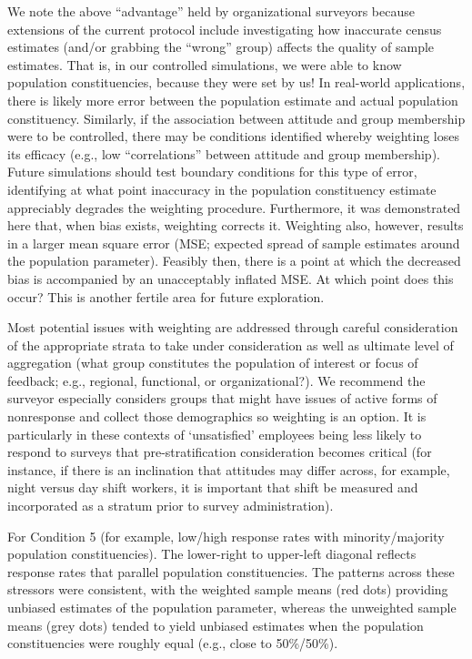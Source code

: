 \documentclass[
  man,mask]{apa7}
\begin{document}
We note the above ``advantage'' held by organizational surveyors because extensions of the current protocol include investigating how inaccurate census estimates (and/or grabbing the ``wrong'' group) affects the quality of sample estimates. That is, in our controlled simulations, we were able to know population constituencies, because they were set by us! In real-world applications, there is likely more error between the population estimate and actual population constituency. Similarly, if the association between attitude and group membership were to be controlled, there may be conditions identified whereby weighting loses its efficacy (e.g., low ``correlations'' between attitude and group membership). Future simulations should test boundary conditions for this type of error, identifying at what point inaccuracy in the population constituency estimate appreciably degrades the weighting procedure. Furthermore, it was demonstrated here that, when bias exists, weighting corrects it. Weighting also, however, results in a larger mean square error (MSE; expected spread of sample estimates around the population parameter). Feasibly then, there is a point at which the decreased bias is accompanied by an unacceptably inflated MSE. At which point does this occur? This is another fertile area for future exploration.

Most potential issues with weighting are addressed through careful consideration of the appropriate strata to take under consideration as well as ultimate level of aggregation (what group constitutes the population of interest or focus of feedback; e.g., regional, functional, or organizational?). We recommend the surveyor especially considers groups that might have issues of active forms of nonresponse and collect those demographics so weighting is an option. It is particularly in these contexts of `unsatisfied' employees being less likely to respond to surveys that pre-stratification consideration becomes critical (for instance, if there is an inclination that attitudes may differ across, for example, night versus day shift workers, it is important that shift be measured and incorporated as a stratum prior to survey administration).

For Condition 5 (for example, low/high response rates with minority/majority population constituencies). The lower-right to upper-left diagonal reflects response rates that parallel population constituencies. The patterns across these stressors were consistent, with the weighted sample means (red dots) providing unbiased estimates of the population parameter, whereas the unweighted sample means (grey dots) tended to yield unbiased estimates when the population constituencies were roughly equal (e.g., close to 50\%/50\%).
\end{document}
